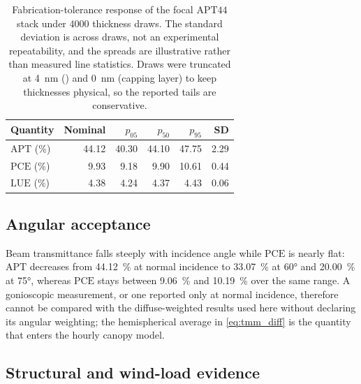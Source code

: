 \documentclass[preprint,12pt,a4paper]{elsarticle}
\begin{document}
\begin{table}[htbp]
 \centering
 \scriptsize
 \caption{Fabrication-tolerance response of the focal $\mathrm{APT44}$ stack under $\num{4000}$ thickness draws. The standard deviation is across draws, not an experimental repeatability, and the spreads are illustrative rather than measured line statistics. Draws were truncated at \qty{4}{\nano\meter} () and \qty{0}{\nano\meter} (capping layer) to keep thicknesses physical, so the reported tails are conservative.}
 \label{tab:sm_tolerance}
 \begin{tabular}{@{}lrrrrr@{}}
 \toprule
 Quantity & Nominal & $p_{05}$ & $p_{50}$ & $p_{95}$ & SD \\
 \midrule
 $\mathrm{APT}$ (\unit{\percent}) & \num{44.12} & \num{40.30} & \num{44.10} & \num{47.75} & \num{2.29} \\
 $\mathrm{PCE}$ (\unit{\percent}) & \num{9.93} & \num{9.18} & \num{9.90} & \num{10.61} & \num{0.44} \\
 $\mathrm{LUE}$ (\unit{\percent}) & \num{4.38} & \num{4.24} & \num{4.37} & \num{4.43} & \num{0.06} \\
 \bottomrule
 \end{tabular}
\end{table}

\subsection{Angular acceptance}
\label{sec:sm_angular}

Beam transmittance falls steeply with incidence angle while $\mathrm{PCE}$ is nearly flat: $\mathrm{APT}$ decreases from \qty{44.12}{\percent} at normal incidence to \qty{33.07}{\percent} at \ang{60} and \qty{20.00}{\percent} at \ang{75}, whereas $\mathrm{PCE}$ stays between \qty{9.06}{\percent} and \qty{10.19}{\percent} over the same range. A gonioscopic measurement, or one reported only at normal incidence, therefore cannot be compared with the diffuse-weighted results used here without declaring its angular weighting; the hemispherical average in \cref{eq:tmm_diff} is the quantity that enters the hourly canopy model.

\subsection{Structural and wind-load evidence}
\label{sec:sm_wind}
\end{document}

